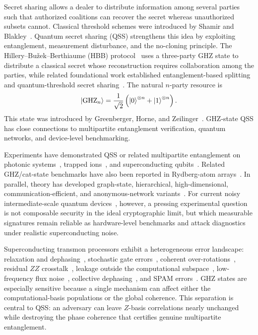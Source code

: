 \documentclass[aip,amsmath,amssymb,reprint,longbibliography]{revtex4-2}
\newcommand{\ghz}{\mathrm{GHZ}}
\begin{document}
Secret sharing allows a dealer to distribute information among several parties such that authorized coalitions can recover the secret whereas unauthorized subsets cannot.  Classical threshold schemes were introduced by Shamir and Blakley~\cite{Shamir1979,Blakley1979}.  Quantum secret sharing (QSS) strengthens this idea by exploiting entanglement, measurement disturbance, and the no-cloning principle.  The Hillery--Bu\v{z}ek--Berthiaume (HBB) protocol~\cite{Hillery1999} uses a three-party GHZ state to distribute a classical secret whose reconstruction requires collaboration among the parties, while related foundational work established entanglement-based splitting and quantum-threshold secret sharing~\cite{Karlsson1999,Cleve1999,Gottesman2000}.  The natural $n$-party resource is
\begin{equation}
\ket{\ghz_n}=\frac{1}{\sqrt{2}}\left(\ket{0}^{\otimes n}+\ket{1}^{\otimes n}\right).
\label{eq:ghz_state}
\end{equation}
This state was introduced by Greenberger, Horne, and Zeilinger~\cite{Greenberger1989}.
GHZ-state QSS has close connections to multipartite entanglement verification, quantum networks, and device-level benchmarking.

Experiments have demonstrated QSS or related multipartite entanglement on photonic systems~\cite{Chen2005,Schmid2005,Bell2014,Williams2019,Lu2016}, trapped ions~\cite{Monz2011}, and superconducting qubits~\cite{Mooney2019,Wei2020,Song2019}.  Related GHZ/cat-state benchmarks have also been reported in Rydberg-atom arrays~\cite{Omran2019}.  In parallel, theory has developed graph-state, hierarchical, high-dimensional, communication-efficient, and anonymous-network variants~\cite{Markham2008,Qin2020,Tavakoli2015,Senthoor2019,Lipinska2018}.  For current noisy intermediate-scale quantum devices~\cite{Preskill2018,Bharti2022}, however, a pressing experimental question is not composable security in the ideal cryptographic limit, but which measurable signatures remain reliable as hardware-level benchmarks and attack diagnostics under realistic superconducting noise.

Superconducting transmon processors exhibit a heterogeneous error landscape: relaxation and dephasing~\cite{Krantz2019}, stochastic gate errors~\cite{Magesan2012}, coherent over-rotations~\cite{McKay2017}, residual $ZZ$ crosstalk~\cite{Mundada2019,Malekakhlagh2020}, leakage outside the computational subspace~\cite{Rol2019,Wood2018}, low-frequency flux noise~\cite{Ithier2005,Paladino2014}, collective dephasing~\cite{Clemens2004,Chirolli2008}, and SPAM errors~\cite{Gambetta2007}.  GHZ states are especially sensitive because a single mechanism can affect either the computational-basis populations or the global coherence.  This separation is central to QSS: an adversary can leave $Z$-basis correlations nearly unchanged while destroying the phase coherence that certifies genuine multipartite entanglement.
\end{document}
